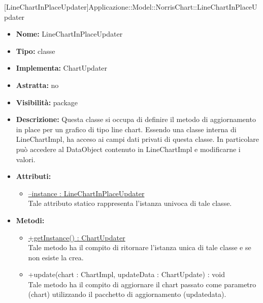 			
			[LineChartInPlaceUpdater]{Applicazione::Model::NorrisChart::LineChartInPlaceUpdater}
			

	
			
			\begin{itemize}
			\item \textbf{Nome:} LineChartInPlaceUpdater
			\item \textbf{Tipo:} classe
			
		\item \textbf{Implementa:}
		ChartUpdater
		\item \textbf{Astratta:}
		no
			\item \textbf{Visibilità:} package
			\item \textbf{Descrizione:} Questa classe si occupa di definire il metodo di aggiornamento in place per un grafico di tipo line chart. Essendo una classe interna di LineChartImpl, ha acceso ai campi dati privati di questa classe. In particolare può accedere al DataObject contenuto in LineChartImpl e modificarne i valori.
			\item \textbf{Attributi:}
				\begin{itemize}
				\setlength{\itemsep}{5pt}
				
					\item[\ding{111}] \underline{--instance : LineChartInPlaceUpdater} \\ [1mm] Tale attributo statico rappresenta l'istanza univoca di tale classe.
				\end{itemize}
		
			\item \textbf{Metodi:}
				\begin{itemize}
				\setlength{\itemsep}{5pt}
				
					\item[\ding{111}] {\underline{+getInstance() : ChartUpdater}} \\ [1mm] Tale metodo ha il compito di ritornare l'istanza unica di tale classe e se non esiste la crea.
					\item[\ding{111}] {{+update(chart : ChartImpl, updateData : ChartUpdate) : void}} \\ [1mm] Tale metodo ha il compito di aggiornare il chart passato come parametro (chart) utilizzando il pacchetto di aggiornamento (updatedata).
				\end{itemize}
		
			\end{itemize}

